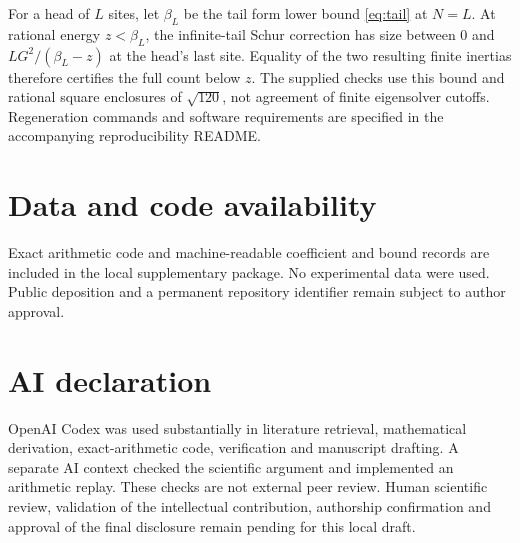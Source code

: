 \documentclass[11pt]{article}
\begin{document}
For a head of $L$ sites, let $\beta_L$ be the tail form lower bound \eqref{eq:tail} at $N=L$. At rational energy $z<\beta_L$, the infinite-tail Schur correction has size between $0$ and $LG^2/(\beta_L-z)$ at the head's last site. Equality of the two resulting finite inertias therefore certifies the full count below $z$. The supplied checks use this bound and rational square enclosures of $\sqrt{120}$, not agreement of finite eigensolver cutoffs. Regeneration commands and software requirements are specified in the accompanying reproducibility README.

\section*{Data and code availability}
Exact arithmetic code and machine-readable coefficient and bound records are included in the local supplementary package. No experimental data were used. Public deposition and a permanent repository identifier remain subject to author approval.

\section*{AI declaration}
OpenAI Codex was used substantially in literature retrieval, mathematical derivation, exact-arithmetic code, verification and manuscript drafting. A separate AI context checked the scientific argument and implemented an arithmetic replay. These checks are not external peer review. Human scientific review, validation of the intellectual contribution, authorship confirmation and approval of the final disclosure remain pending for this local draft.



\end{document}
